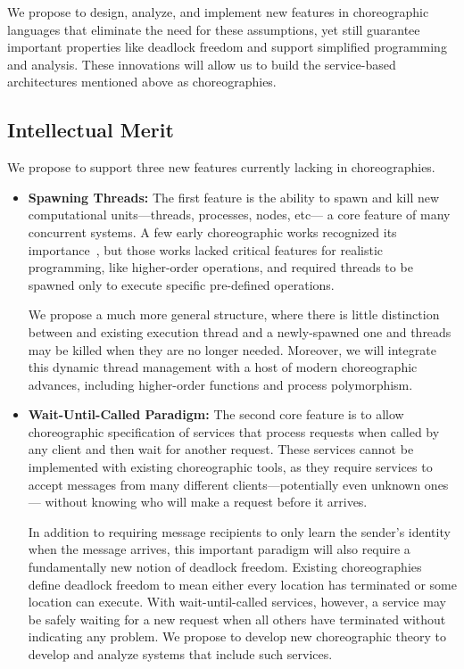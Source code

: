 We propose to design, analyze, and implement new features in choreographic languages that eliminate the need for these assumptions,
yet still guarantee important properties like deadlock freedom and support simplified programming and analysis.
These innovations will allow us to build the service-based architectures mentioned above as choreographies.

\subsection{Intellectual Merit}
We propose to support three new features currently lacking in choreographies.

\begin{itemize}[leftmargin=*]
  \item \textbf{Spawning Threads:}
    The first feature is the ability to spawn and kill new computational units---threads, processes, nodes, etc---%
    a core feature of many concurrent systems.
    A few early choreographic works recognized its importance~\citep{CarboneM13,CruzFilipeM16a},
    but those works lacked critical features for realistic programming, like higher-order operations,
    and required threads to be spawned only to execute specific pre-defined operations.

    We propose a much more general structure, where there is little distinction between
    and existing execution thread and a newly-spawned one and threads may be killed when they are no longer needed.
    Moreover, we will integrate this dynamic thread management with a host of modern choreographic advances,
    including higher-order functions and process polymorphism.

  \item \textbf{Wait-Until-Called Paradigm:}
    The second core feature is to allow choreographic specification of services
    that process requests when called by any client and then wait for another request.
    These services cannot be implemented with existing choreographic tools,
    as they require services to accept messages from many different clients---potentially even unknown ones---%
    without knowing who will make a request before it arrives.

    In addition to requiring message recipients to only learn the sender's identity when the message arrives,
    this important paradigm will also require a fundamentally new notion of deadlock freedom.
    Existing choreographies define deadlock freedom to mean either every location has terminated or some location can execute.
    With wait-until-called services, however, a service may be safely waiting for a new request when all others have terminated without indicating any problem.
    We propose to develop new choreographic theory to develop and analyze systems that include such services.


\end{itemize}
